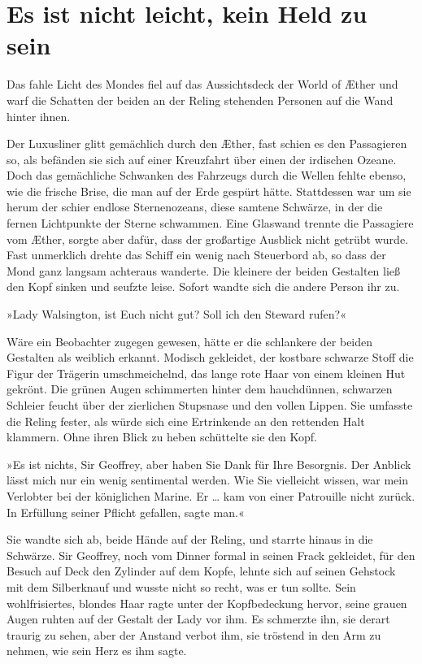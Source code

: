 \section{Es ist nicht leicht, kein Held zu sein}
Das fahle Licht des Mondes fiel auf das Aussichtsdeck der World of
Æther und warf die Schatten der beiden an der Reling stehenden
Personen auf die Wand hinter ihnen.

Der Luxusliner glitt gemächlich durch den Æther, fast schien es den
Passagieren so, als befänden sie sich auf einer Kreuzfahrt über
einen der irdischen Ozeane. Doch das gemächliche Schwanken des
Fahrzeugs durch die Wellen fehlte ebenso, wie die frische Brise,
die man auf der Erde gespürt hätte. Stattdessen war um sie herum
der schier endlose Sternenozeans, diese samtene Schwärze, in der
die fernen Lichtpunkte der Sterne schwammen. Eine Glaswand trennte
die Passagiere vom Æther, sorgte aber dafür, dass der großartige
Ausblick nicht getrübt wurde. Fast unmerklich drehte das Schiff ein
wenig nach Steuerbord ab, so dass der Mond ganz langsam achteraus
wanderte. Die kleinere der beiden Gestalten ließ den Kopf sinken
und seufzte leise. Sofort wandte sich die andere Person ihr zu.

\bigpar

»Lady Walsington, ist Euch nicht gut? Soll ich den Steward rufen?«

\bigpar

Wäre ein Beobachter zugegen gewesen, hätte er die schlankere der
beiden Gestalten als weiblich erkannt. Modisch gekleidet, der
kostbare schwarze Stoff die Figur der Trägerin umschmeichelnd, das
lange rote Haar von einem kleinen Hut gekrönt. Die grünen Augen
schimmerten hinter dem hauchdünnen, schwarzen Schleier feucht über
der zierlichen Stupsnase und den vollen Lippen. Sie umfasste die
Reling fester, als würde sich eine Ertrinkende an den rettenden
Halt klammern. Ohne ihren Blick zu heben schüttelte sie den Kopf.

»Es ist nichts, Sir Geoffrey, aber haben Sie Dank für Ihre
Besorgnis. Der Anblick lässt mich nur ein wenig sentimental werden.
Wie Sie vielleicht wissen, war mein Verlobter bei der königlichen
Marine. Er \ldots{} kam von einer Patrouille nicht zurück. In Erfüllung
seiner Pflicht gefallen, sagte man.«

Sie wandte sich ab, beide Hände auf der Reling, und starrte hinaus
in die Schwärze. Sir Geoffrey, noch vom Dinner formal in seinen
Frack gekleidet, für den Besuch auf Deck den Zylinder auf dem
Kopfe, lehnte sich auf seinen Gehstock mit dem Silberknauf und
wusste nicht so recht, was er tun sollte. Sein wohlfrisiertes,
blondes Haar ragte unter der Kopfbedeckung hervor, seine grauen
Augen ruhten auf der Gestalt der Lady vor ihm. Es schmerzte ihn,
sie derart traurig zu sehen, aber der Anstand verbot ihm, sie
tröstend in den Arm zu nehmen, wie sein Herz es ihm sagte.

